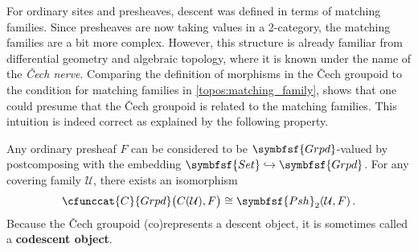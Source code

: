         For ordinary sites and presheaves, descent was defined in terms of matching families. Since presheaves are now taking values in a 2-category, the matching families are a bit more complex. However, this structure is already familiar from differential geometry and algebraic topology, where it is known under the name of the \textit{\v{C}ech nerve}.
        Comparing the definition of morphisms in the \v{C}ech groupoid to the condition for matching families in \cref{topos:matching_family}, shows that one could presume that the \v{C}ech groupoid is related to the matching families. This intuition is indeed correct as explained by the following property.
        \begin{property}\label{topos:cech_matching_families}
            Any ordinary presheaf $F$ can be considered to be $\symbfsf{Grpd}$-valued by postcomposing with the embedding $\symbfsf{Set}\hookrightarrow\symbfsf{Grpd}$. For any covering family $\mathcal{U}$, there exists an isomorphism
            \begin{gather}
                \cfunccat{C}{Grpd}\bigl(C(\mathcal{U}),F\bigr)\cong\symbfsf{Psh}_2(\mathcal{U},F)\,.
            \end{gather}
            Because the \v{C}ech groupoid (co)represents a descent object, it is sometimes called a \textbf{codescent object}.
        \end{property}
